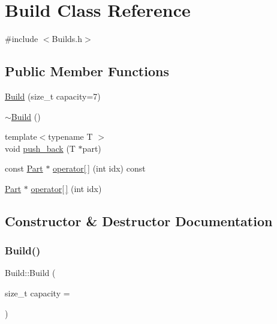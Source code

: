 \hypertarget{class_build}{}\section{Build Class Reference}
\label{class_build}


{\ttfamily \#include $<$Builds.\+h$>$}

\subsection*{Public Member Functions}
\begin{DoxyCompactItemize}
\item 
\mbox{\hyperlink{class_build_ab9b72c3479d483c0b452af30bb544de8}{Build}} (size\+\_\+t capacity=7)
\item 
\mbox{\hyperlink{class_build_a8f1d400e9bc158b6339cc1785b18d07b}{$\sim$\+Build}} ()
\item 
{\footnotesize template$<$typename T $>$ }\\void \mbox{\hyperlink{class_build_aba0548391a8c613ed2a9d81d4d3b2a4b}{push\+\_\+back}} (T $\ast$part)
\item 
const \mbox{\hyperlink{class_part}{Part}} $\ast$ \mbox{\hyperlink{class_build_af3e03ed173016d7ff348d1e7057bd97c}{operator\mbox{[}$\,$\mbox{]}}} (int idx) const
\item 
\mbox{\hyperlink{class_part}{Part}} $\ast$ \mbox{\hyperlink{class_build_aa48e871d88c60272ab5f6cd5b97aaad0}{operator\mbox{[}$\,$\mbox{]}}} (int idx)
\end{DoxyCompactItemize}


\subsection{Constructor \& Destructor Documentation}
\mbox{\label{class_build_ab9b72c3479d483c0b452af30bb544de8}} 
\subsubsection{\texorpdfstring{Build()}{Build()}}
{\footnotesize\ttfamily Build\+::\+Build (\begin{DoxyParamCaption}\item[{size\+\_\+t}]{capacity = {} }\end{DoxyParamCaption})\hspace{0.3cm}{\ttfamily [inline]}}

